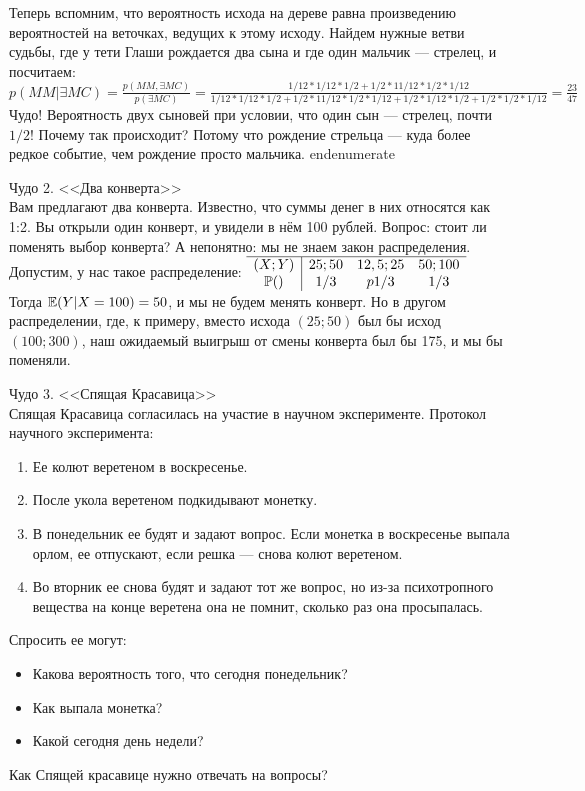 Теперь вспомним, что вероятность исхода на дереве равна произведению вероятностей на веточках, ведущих к этому исходу. Найдем нужные ветви судьбы, где у тети Глаши рождается два сына и где один мальчик --- стрелец, и посчитаем:
$p(MM|\exists {MC})=\frac{p(MM,\exists{MC})}{p(\exists {MC})}=\frac{1/12*1/12*1/2+1/2*11/12*1/2*1/12}{1/12*1/12*1/2+1/2*11/12*1/2*1/12+1/2*1/12*1/2+1/2*1/2*1/12}=\frac{23}{47}$
Чудо! Вероятность двух сыновей при условии, что один сын --- стрелец, почти $1/2$!
Почему так происходит? Потому что рождение стрельца --- куда более редкое событие, чем рождение просто мальчика.
end{enumerate}

Чудо 2. <<Два конверта>>\\
Вам предлагают два конверта. Известно, что суммы денег в них относятся как 1:2. Вы открыли один конверт, и увидели в нём 100 рублей. Вопрос: стоит ли поменять выбор конверта?
А непонятно: мы не знаем закон распределения. 
Допустим, у нас такое распределение:
$\begin{array}{c|ccc}
\hline
(X;Y) & {25;50} & {12,5;25} & {50;100} \\
\P() & 1/3 & p {1/3} & {1/3} \\
\end{array}$ \\
Тогда $\E(Y|X=100)=50$, и мы не будем менять конверт. Но в другом распределении, где, к примеру, вместо исхода $(25;50)$ был бы исход $(100;300)$, наш ожидаемый выигрыш от смены конверта был бы 175, и мы бы поменяли. 

Чудо 3.  <<Спящая Красавица>>\\
Спящая Красавица согласилась на участие в научном эксперименте. 
Протокол научного эксперимента:
\begin{enumerate}
\item Ее колют веретеном в воскресенье.
\item После укола веретеном подкидывают монетку.
\item В понедельник ее будят и задают вопрос. Если монетка в воскресенье выпала орлом, ее отпускают, если решка --- снова колют веретеном.
\item Во вторник ее снова будят и задают тот же вопрос, но из-за психотропного вещества на конце веретена она не помнит, сколько раз она просыпалась. 
\end{enumerate}
Спросить ее могут:
\begin{itemize}
\item Какова вероятность того, что сегодня понедельник?
\item Как выпала монетка?
\item Какой сегодня день недели?
\end{itemize}
 Как Спящей красавице нужно отвечать на вопросы?

